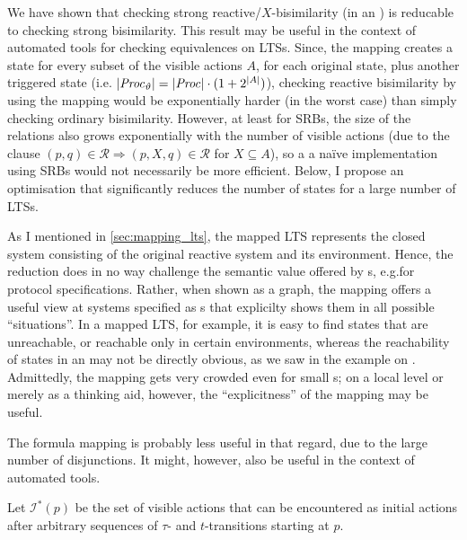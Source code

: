 %
\begin{isabellebody}%
%
%
\isadelimtheory
%
\endisadelimtheory
%
\isatagtheory
%
\endisatagtheory
{\isafoldtheory}%
%
\isadelimtheory
%
\endisadelimtheory
%
\isadelimdocument
%
\endisadelimdocument
%
\isatagdocument
%
\isamarkuptrue%
%
\endisatagdocument
{\isafolddocument}%
%
\isadelimdocument
%
\endisadelimdocument
%
\begin{isamarkuptext}%
\label{chap:discussion}%
\end{isamarkuptext}\isamarkuptrue%
%
\begin{isamarkuptext}%
We have shown that checking strong reactive/$X$-bisimilarity (in an \LTSt{}) is reducable to checking strong bisimilarity. This result may be useful in the context of automated tools for checking equivalences on LTSs.
Since, the mapping creates a state for every subset of the visible actions $A$, for each original state, plus another triggered state (i.e.\@ 
$|\mathit{Proc}_\vartheta| = |\mathit{Proc}| \cdot (1+2^{|A|})$),
checking reactive bisimilarity by using the mapping would be exponentially harder (in the worst case) than simply checking ordinary bisimilarity. However, at least for SRBs, the size of the relations also grows exponentially with the number of visible actions (due to the clause $(p,q)\in\mathcal{R} \Longrightarrow (p,X,q)\in\mathcal{R}$ for $X\subseteq A$), so a a naïve implementation using SRBs would not necessarily be more efficient. Below, I propose an optimisation that significantly reduces the number of states for a large number of LTSs.

As I mentioned in \cref{sec:mapping_lts}, the mapped LTS represents the closed system consisting of the original reactive system and its environment. Hence, the reduction does in no way challenge the semantic value offered by \LTSt{}s, e.g.\@ for protocol specifications. Rather, when shown as a graph, the mapping offers a useful view at systems specified as \LTSt{}s that explicilty shows them in all possible \enquote{situations}. In a mapped LTS, for example, it is easy to find states that are unreachable, or reachable only in certain environments, whereas the reachability of states in an \LTSt{} may not be directly obvious, as we saw in the example on . Admittedly, the mapping gets very crowded even for small \LTSt{}s; on a local level or merely as a thinking aid, however, the \enquote{explicitness} of the mapping may be useful.

The formula mapping is probably less useful in that regard, due to the large number of disjunctions. It might, however, also be useful in the context of automated tools.%
\end{isamarkuptext}\isamarkuptrue%
%
\isadelimdocument
%
\endisadelimdocument
%
\isatagdocument
%
\isamarkuptrue%
%
\endisatagdocument
{\isafolddocument}%
%
\isadelimdocument
%
\endisadelimdocument
%
\begin{isamarkuptext}%
Let $\mathcal{I}^*(p)$ be the set of visible actions that can be encountered as initial actions after arbitrary sequences of $\tau$- and $t$-transitions starting at $p$.


\end{isamarkuptext}
\end{isabellebody}
